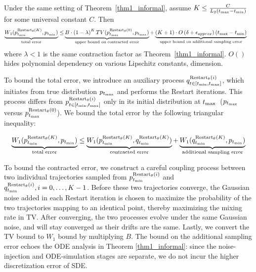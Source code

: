 \begin{theorem}[Informal]
\label{thm2_informal}
Under the same setting of Theorem~\ref{thm1_informal}, 
assume $K \leq \frac{C}{L_2 \left( t_{\textrm{max}} - t_{\textrm{min}} \right)}$ for some universal constant $C$. Then
{\footnotesize
\begin{align*}
   \underbrace{W_1(p^{{\textrm{Restart}_\theta}(K)}_{t_{\textrm{min}}}, p_{t_{\textrm{min}}})}_{\textrm{total error}} \leq& \underbrace{B \cdot \left( 1 - \lambda \right)^K TV(p^{{\textrm{Restart}_\theta}(0)}_{t_{\textrm{max}}}, p_{t_{\textrm{max}}})}_{\textrm{upper bound on contracted error}} + \underbrace{(K+1) \cdot O\left( \delta + {\epsilon_{approx}} \right) \left( t_{\textrm{max}} - t_{\textrm{min}} \right)}_{\textrm{upper bound on additional sampling error}}
\end{align*}}
where $\lambda<1$ is the same contraction factor as Theorem~\ref{thm1_informal}. $O()$ hides polynomial dependency on various Lipschitz constants, dimension.
\end{theorem}
\vspace{-6pt}
\begin{proofs}
To bound the total error, we introduce an auxiliary process {\footnotesize $q^{{\textrm{Restart}_\theta}(i)}_{t \in [t_{\textrm{min}}, t_{\textrm{max}}]}$}, which initiates from true distribution $p_{t_{\textrm{max}}}$ and performs the Restart iterations. This process differs from {\footnotesize ${p}^{{\textrm{Restart}_\theta}(i)}_{t \in [t_{\textrm{min}}, t_{\textrm{max}}]}$} only in its initial distribution at $t_{\textrm{max}}$~($p_{t_{\textrm{max}}}$ versus {\footnotesize $p^{{\textrm{Restart}_\theta}(0)}_{t_{\textrm{max}}}$}). We bound the total error by the following triangular inequality:

{\footnotesize
\begin{align*}
    \underbrace{W_1(p^{{\textrm{Restart}_\theta}(K)}_{t_{\textrm{min}}}, p_{t_{\textrm{min}}})}_{\textrm{total error}} \le \underbrace{W_1(p^{{\textrm{Restart}_\theta}(K)}_{t_{\textrm{min}}}, q^{{\textrm{Restart}_\theta}(K)}_{t_{\textrm{min}}})}_{\textrm{contracted error}} + \underbrace{W_1(q^{{\textrm{Restart}_\theta}(K)}_{t_{\textrm{min}}}, p_{t_{\textrm{min}}})}_{\textrm{additional sampling error}}
\end{align*}}

To bound the contracted error, we construct a careful coupling process between two individual trajectories sampled from {\footnotesize $p^{{\textrm{Restart}_\theta}(i)}_{t_{\textrm{min}}}$} and {\footnotesize $q^{{\textrm{Restart}_\theta}(i)}_{t_{\textrm{min}}}, i=0, \dots, K-1$}. Before these two trajectories converge, the Gaussian noise added in each Restart iteration is chosen to maximize the probability of the two trajectories mapping to an identical point, thereby maximizing the mixing rate in TV. After converging, the two processes evolve under the same Gaussian noise, and will stay converged as their drifts are the same. Lastly, we convert the TV bound to $W_1$ bound by multiplying $B$. The bound on the additional sampling error echoes the ODE analysis in Theorem \ref{thm1_informal}: since the noise-injection and ODE-simulation stages are separate, we do not incur the higher discretization error of SDE.
    \vspace{-6pt}
\end{proofs}
